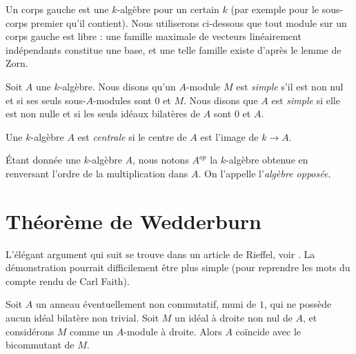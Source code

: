 \noindent
Un corps gauche est une $k$-algèbre pour un certain $k$ (par exemple pour le sous-corps premier
qu'il contient). Nous utiliserons ci-dessous que tout module sur un corps gauche
est libre : une famille maximale de vecteurs linéairement indépendants constitue une
base, et une telle famille existe d'après le lemme de Zorn.

\begin{definition}
\label{definition-simple}
Soit $A$ une $k$-algèbre.
Nous disons qu'un $A$-module $M$ est {\it simple} s'il est non nul et si
ses seuls sous-$A$-modules sont $0$ et $M$.
Nous disons que $A$ est {\it simple} si elle est non nulle et si les seuls
idéaux bilatères de $A$ sont
$0$ et $A$.
\end{definition}

\begin{definition}
\label{definition-central}
Une $k$-algèbre $A$ est {\it centrale} si le centre de $A$ est l'image de
$k \to A$.
\end{definition}

\begin{definition}
\label{definition-opposite}
Étant donnée une $k$-algèbre $A$, nous notons $A^{op}$ la $k$-algèbre obtenue
en renversant l'ordre de la multiplication dans $A$. On l'appelle
l'{\it algèbre opposée}.
\end{definition}




\section{Théorème de Wedderburn}
\label{section-wedderburn}

\noindent
L'élégant argument qui suit se trouve dans un article de Rieffel, voir
\cite{Rieffel}. La démonstration pourrait difficilement être plus simple (pour reprendre
les mots du compte rendu de Carl Faith).

\begin{lemma}
\label{lemma-rieffel}
Soit $A$ un anneau éventuellement non commutatif, muni de $1$, qui ne possède aucun
idéal bilatère non trivial. Soit $M$ un idéal à droite non nul de $A$,
et considérons $M$ comme un $A$-module à droite. Alors $A$ coïncide avec le
bicommutant de $M$.
\end{lemma}

